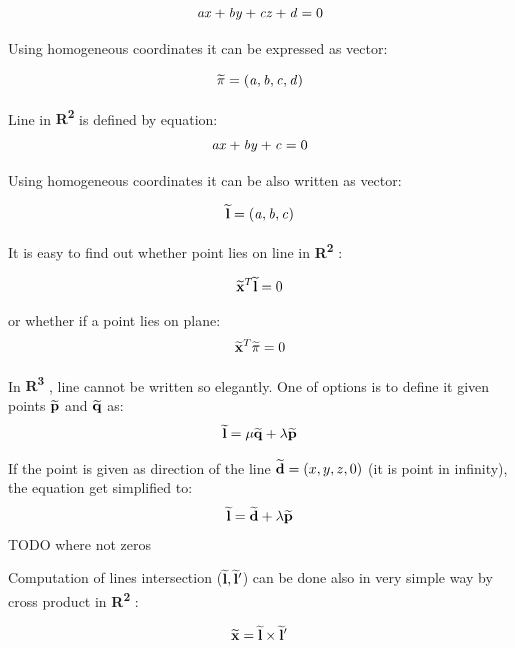 \documentclass[a4paper,12pt]{article}
\newcommand{\ehvect}[1]{
{\bf \widetilde{#1}}
}
\newcommand{\escal}[1]{
{\it #1}
}
\newcommand{\eucl}[1]{
{\bf R\textsuperscript{#1}}
}
\begin{document}
\begin{equation}
\escal{a}\escal{x} + \escal{b}\escal{y} + \escal{c}\escal{z} + \escal{d} = 0
\end{equation}

Using homogeneous coordinates it can be expressed as vector:

\begin{equation}
\ehvect{\pi} =  (\escal{a}, \escal{b}, \escal{c}, \escal{d})
\end{equation}


Line in \eucl{2} is defined by equation:
\begin{equation}
\escal{a}\escal{x} + \escal{b}\escal{y} + \escal{c} = 0
\end{equation}

Using homogeneous coordinates it can be also written as vector:

\begin{equation}
\ehvect{l} =  (\escal{a}, \escal{b}, \escal{c})
\end{equation}

It is easy to find out whether point lies on line in \eucl{2}:

\begin{equation}
\ehvect{x}^{T} \ehvect{l} = 0
\end{equation}

or whether if a point lies on plane:
\begin{equation}
\ehvect{x}^{T} \ehvect{\pi} = 0
\end{equation}


In \eucl{3}, line cannot be written so elegantly.
One of options is to define it given points $\ehvect{p}$ and $\ehvect{q}$ as:
\begin{equation}
 \ehvect{l} = \escal{\mu}\ehvect{q} + \escal{\lambda}\ehvect{p}
\end{equation}

If the point is given as direction of the line $\ehvect{d} = (x, y, z, 0)$ (it is point in infinity), the equation get simplified to:
\begin{equation}
\ehvect{l} = \ehvect{d} + \escal{\lambda}\ehvect{p} \label{eq:hline}
\end{equation}
TODO where not zeros

Computation of lines intersection ($\ehvect{l}, \ehvect{l}'$) can be done also in very simple way by cross product in \eucl{2}:

\begin{equation}
\ehvect{x} = \ehvect{l} \times \ehvect{l}' \label{eq:def_hline_pts}
\end{equation}
\end{document}
